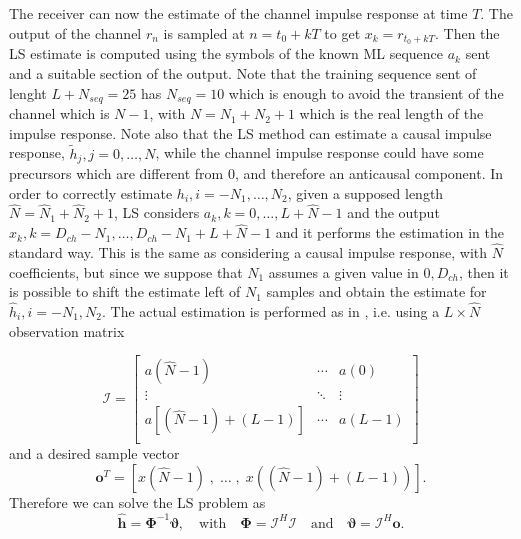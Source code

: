 \documentclass[10pt]{article}
\begin{document}
The receiver can now the estimate of the channel impulse response at time $T$. The output of the channel $r_n$ is sampled at $n = t_0 + kT$ to get $x_k = r_{t_0 + kT}$. Then the LS estimate is computed using the symbols of the known ML sequence $a_k$ sent and a suitable section of the output. Note that the training sequence sent of lenght $L + N_{seq} = 25$ has $N_{seq} = 10$ which is enough to avoid the transient of the channel which is $N - 1$, with $N = N_1 + N_2 + 1$ which is the real length of the impulse response.
Note also that the LS method can estimate a causal impulse response, $\tilde{h}_j, j = 0, \dots, N$, while the channel impulse response could have some precursors which are different from 0, and therefore an anticausal component. In order to correctly estimate $h_i, i = -N_1, \dots, N_2$, given a supposed length $\hat{N} = \hat{N}_1 + \hat{N}_2 + 1$, LS considers $a_k, k = 0, \dots, L+\hat{N}-1$ and the output $x_k, k = D_{ch} - N_1, \dots, D_{ch} - N_1 + L + \hat{N} - 1$ and it performs the estimation in the standard way. This is the same as considering a causal impulse response, with $\hat{N}$ coefficients, but since we suppose that $N_1$ assumes a given value in $0, D_{ch}$, then it is possible to shift the estimate left of $N_1$ samples and obtain the estimate for $\hat{h}_i, i = -N_1, N_2$. 
The actual estimation is performed as in \cite[p.~246]{bc}, i.e. using a $L \times \hat{N}$ observation matrix

\begin{equation}
	\boldsymbol{\mathcal{I}} =
 \begin{bmatrix}
  a(\hat{N}-1) & \cdots & a(0) \\
  \vdots  & \ddots & \vdots  \\
a[(\hat{N}-1)+(L-1)] & \cdots & a(L-1) \\
 \end{bmatrix}
\end{equation}
and a desired sample vector
\begin{equation}
\mathbf{o}^T = \left[ x(\hat{N}-1)\;,\; \ldots\; , \;x((\hat{N}-1)+(L-1)) \right].
\end{equation}
Therefore we can solve the LS problem as
\begin{equation}
	\hat{\mathbf{h}}= \mathbf{\Phi}^{-1} \boldsymbol{\vartheta}, \quad\mathrm{ with } \quad \mathbf{\Phi}=\boldsymbol{\mathcal{I}}^H \boldsymbol{\mathcal{I}} \quad \mathrm{ and }\quad \boldsymbol{\vartheta} = \boldsymbol{\mathcal{I}}^H \mathbf{o}.
\end{equation}
\end{document}
